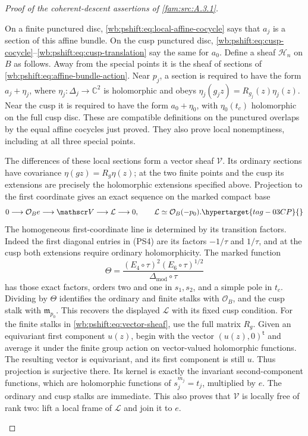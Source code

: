 \begin{proof}[Proof of the coherent-descent assertions of \cref{fam:src:A.3.1}]
\begin{enumerate}[label=\arabic*.,leftmargin=*]
On a finite punctured disc, \eqref{wb:pshift:eq:local-affine-cocycle} says that $a_j$ is a section of
this affine bundle. On the cusp punctured disc, \eqref{wb:pshift:eq:cusp-cocycle}--\eqref{wb:pshift:eq:cusp-translation} say
the same for $a_0$. Define a sheaf $\mathscr H_n$ on $B$ as follows.
Away from the special points it is the sheaf of sections of \eqref{wb:pshift:eq:affine-bundle-action}.
Near $p_j$, a section is required to have the form $a_j+\eta_j$,
where $\eta_j:\Delta_j\to\mathbb C^2$ is holomorphic and obeys
$\eta_j(g_jz)=R_{g_j}(z)\eta_j(z)$. Near the cusp it is required
to have the form $a_0+\eta_0$, with $\eta_0(t_c)$ holomorphic on
the full cusp disc. These are compatible definitions on the punctured
overlaps by the equal affine cocycles just proved. They also prove
local nonemptiness, including at all three special points.

The differences of these local sections form a vector sheaf
$\mathscr V$. Its ordinary sections have covariance $\eta(gz)=R_g\eta(z)$;
at the two finite points and the cusp its extensions are precisely
the holomorphic extensions specified above. Projection to the first
coordinate gives an exact sequence on the marked compact base
\begin{equation}
 0\longrightarrow\mathcal O_B e\longrightarrow\mathscr V
        \longrightarrow\mathcal L\longrightarrow0,
                  \qquad \mathcal L\simeq\mathcal O_B(-p_0).
 \hypertarget{tag-03CP}{}\label{wb:pshift:eq:vector-sheaf}
\end{equation}
The homogeneous first-coordinate line is determined by its transition factors. Indeed
the first diagonal entries in (PS4) are its factors $-1/\tau$ and
$1/\tau$, and at the cusp both extensions require ordinary
holomorphicity. The marked function
\[
 \Theta=\frac{(E_4\circ\tau)^2(E_6\circ\tau)^{1/2}}
                 {\Delta_{\mathrm{mod}}\circ\tau}
\]
has those exact factors, orders two and one in $s_1,s_2$, and a
simple pole in $t_c$. Dividing by $\Theta$ identifies the ordinary
and finite stalks with $\mathcal O_B$, and the cusp stalk with
$\mathfrak m_{p_0}$. This recovers the displayed $\mathcal L$
with its fixed cusp condition. 
For the finite stalks in \eqref{wb:pshift:eq:vector-sheaf}, use the full matrix $R_g$. Given an equivariant first component
$u(z)$, begin with the vector $(u(z),0)^{\mathsf t}$ and average it
under the finite group action on vector-valued holomorphic functions.
The resulting vector is equivariant, and its first component is
still $u$. Thus projection is surjective there. Its kernel is
exactly the invariant second-component functions, which are
holomorphic functions of $s_j^{m_j}=t_j$, multiplied by $e$.
The ordinary and cusp stalks are immediate. This also proves that
$\mathscr V$ is locally free of rank two: lift a local frame of
$\mathcal L$ and join it to $e$.


\end{enumerate}
\end{proof}
